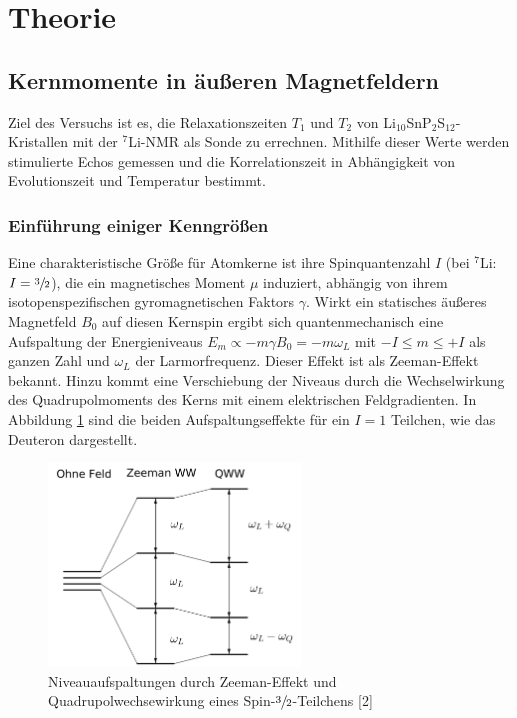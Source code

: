 
\setcounter{page}{1}
\section{Theorie}
\subsection{Kernmomente in äußeren Magnetfeldern}
Ziel des Versuchs ist es, die Relaxationszeiten $T_1$ und $T_2$ von Li$_{10}$SnP$_2$S$_{12}$-Kristallen mit der $^7$Li-NMR als Sonde zu errechnen. Mithilfe dieser Werte
werden stimulierte Echos gemessen und die Korrelationszeit in Abhängigkeit von Evolutionszeit und Temperatur bestimmt.

\subsubsection{Einführung einiger Kenngrößen}
Eine charakteristische Größe für Atomkerne ist ihre Spinquantenzahl $I$ (bei $^7$Li: $I = \sfrac32$), die ein magnetisches Moment $\mu$ induziert, abhängig von ihrem isotopenspezifischen
gyromagnetischen Faktors $\gamma$. Wirkt ein statisches äußeres Magnetfeld $B_0$ auf diesen Kernspin ergibt sich quantenmechanisch eine Aufspaltung der
Energieniveaus $E_m \propto - m \gamma B_0 = -m \omega_L $ mit $-I \leq m \leq +I$ als ganzen Zahl und $\omega_L$ der Larmorfrequenz. Dieser Effekt 
ist als Zeeman-Effekt bekannt. Hinzu kommt eine Verschiebung der Niveaus durch die Wechselwirkung des Quadrupolmoments des Kerns mit einem elektrischen 
Feldgradienten. In Abbildung \ref{pic_termschema} sind die beiden Aufspaltungseffekte für ein $I=1$ Teilchen, wie das Deuteron dargestellt.

\begin{figure}[H]
 \includegraphics[width=0.6\textwidth]{../pics/termschema.jpg}
 \caption{Niveauaufspaltungen durch Zeeman-Effekt und Quadrupolwechsewirkung eines Spin-$\sfrac32$-Teilchens [2]}
 \label{pic_termschema}
\end{figure}

